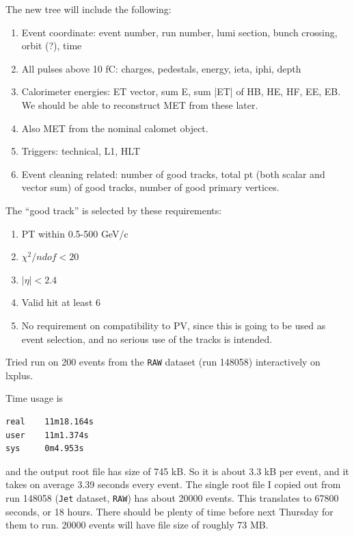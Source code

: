 

The new tree will include the following:

\begin{enumerate}
\item Event coordinate: event number, run number, lumi section, bunch crossing, orbit (?), time
\item All pulses above 10 fC: charges, pedestals, energy, ieta, iphi, depth
\item Calorimeter energies: ET vector, sum E, sum |ET| of HB, HE, HF, EE, EB.  We should be able to reconstruct MET from these later.
\item Also MET from the nominal calomet object.
\item Triggers: technical, L1, HLT
\item Event cleaning related: number of good tracks, total pt (both scalar and vector sum) of good tracks, number of good primary vertices.
\end{enumerate}

The ``good track'' is selected by these requirements:

\begin{enumerate}
\item PT within 0.5-500 GeV/c
\item $\chi^2/ndof < 20$
\item $|\eta| < 2.4$
\item Valid hit at least 6
\item No requirement on compatibility to PV, since this is going to be used as event selection, and no serious use of the tracks is intended.
\end{enumerate}


Tried run on 200 events from the \texttt{RAW}  dataset (run 148058) interactively on lxplus.

Time usage is

\begin{verbatim}
real    11m18.164s
user    11m1.374s
sys     0m4.953s
\end{verbatim}

and the output root file has size of 745 kB.  So it is about 3.3 kB per event, and it takes on average 3.39 seconds every event.
The single root file I copied out from run 148058 (\texttt{Jet} dataset, \texttt{RAW}) has about 20000 events.  This translates to 67800 seconds, or 18 hours.
There should be plenty of time before next Thursday for them to run.  20000 events will have file size of roughly 73 MB.

